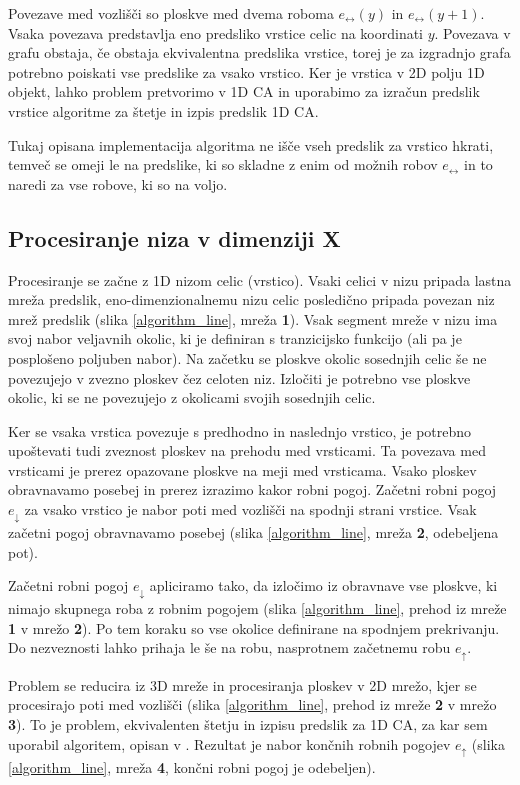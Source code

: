 \documentclass[12pt,a4paper,openany,twoside]{book}
\begin{document}
Povezave med vozlišči so ploskve med dvema roboma
\(e_{\leftrightarrow}(y)\) in \(e_{\leftrightarrow}(y+1)\).
Vsaka povezava predstavlja eno predsliko vrstice celic na koordinati \(y\).
Povezava v grafu obstaja, če obstaja ekvivalentna predslika vrstice,
torej je za izgradnjo grafa potrebno poiskati vse predslike za vsako vrstico.
Ker je vrstica v 2D polju 1D objekt, lahko problem pretvorimo v 1D CA in
uporabimo za izračun predslik vrstice algoritme za štetje in izpis predslik 1D CA.

Tukaj opisana implementacija algoritma ne išče vseh predslik za vrstico hkrati,
temveč se omeji le na predslike, ki so skladne z enim od možnih robov
\(e_{\leftrightarrow}\) in to naredi za vse robove, ki so na voljo.

\subsection{Procesiranje niza v dimenziji X}

Procesiranje se začne z 1D nizom celic (vrstico).
Vsaki celici v nizu pripada lastna mreža predslik, eno-dimenzionalnemu nizu celic
posledično pripada povezan niz mrež predslik (slika \ref{algorithm_line}, mreža \textbf{1}).
Vsak segment mreže v nizu ima svoj nabor veljavnih okolic,
ki je definiran s tranzicijsko funkcijo (ali pa je posplošeno poljuben nabor).
Na začetku se ploskve okolic sosednjih celic še ne povezujejo v
zvezno ploskev čez celoten niz. Izločiti je potrebno vse ploskve okolic,
ki se ne povezujejo z okolicami svojih sosednjih celic.

Ker se vsaka vrstica povezuje s predhodno in naslednjo vrstico, je potrebno
upoštevati tudi zveznost ploskev na prehodu med vrsticami.
Ta povezava med vrsticami je prerez opazovane ploskve na meji med vrsticama.
Vsako ploskev obravnavamo posebej in prerez izrazimo kakor robni pogoj.
Začetni robni pogoj \(e_{\downarrow}\) za vsako vrstico
je nabor poti med vozlišči na spodnji strani vrstice.
Vsak začetni pogoj obravnavamo posebej (slika \ref{algorithm_line}, mreža \textbf{2}, odebeljena pot).

Začetni robni pogoj \(e_{\downarrow}\) apliciramo tako,
da izločimo iz obravnave vse ploskve,
ki nimajo skupnega roba z robnim pogojem (slika \ref{algorithm_line},
prehod iz mreže \textbf{1} v mrežo \textbf{2}).
Po tem koraku so vse okolice definirane na spodnjem prekrivanju.
Do nezveznosti lahko prihaja le še na robu,
nasprotnem začetnemu robu \(e_{\uparrow}\).

Problem se reducira iz 3D mreže in procesiranja ploskev v 2D mrežo,
kjer se procesirajo poti med vozlišči (slika \ref{algorithm_line},
prehod iz mreže \textbf{2} v mrežo \textbf{3}).
To je problem, ekvivalenten štetju in izpisu predslik za 1D CA,
za kar sem uporabil algoritem, opisan v \cite{JerasDobnikar2007}.
Rezultat je nabor končnih robnih pogojev \(e_{\uparrow}\)
(slika \ref{algorithm_line}, mreža \textbf{4}, končni robni pogoj je odebeljen).
\end{document}
